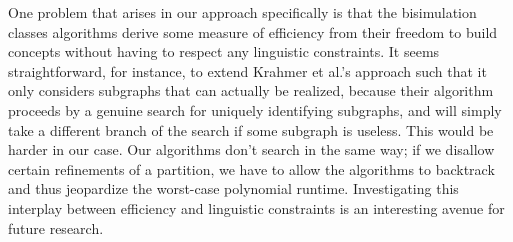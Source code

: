 One problem that arises in our approach specifically is that the
bisimulation classes algorithms derive some measure of efficiency from
their freedom to build concepts without having to respect any
linguistic constraints.  It seems straightforward, for instance, to
extend Krahmer et al.'s  approach such that it
only considers subgraphs that can actually be realized, because their
algorithm proceeds by a genuine search for uniquely identifying
subgraphs, and will simply take a different branch of the search if
some subgraph is useless.  This would be harder in our case.  Our
algorithms don't search in the same way; if we disallow certain
refinements of a partition, we have to allow the algorithms to
backtrack and thus jeopardize the worst-case polynomial runtime.
Investigating this interplay between efficiency and linguistic
constraints is an interesting avenue for future research.




